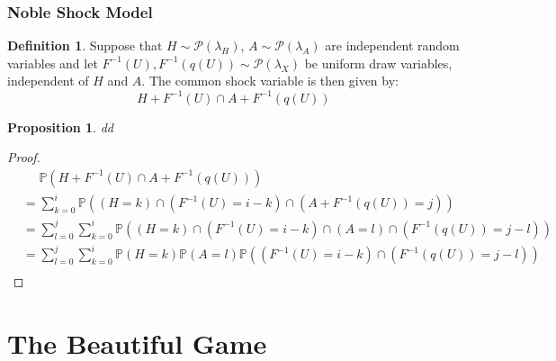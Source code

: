 \documentclass[a4paper,11pt,oneside]{book}
\theoremstyle{plain}
\newtheorem{prop}[thm]{Proposition}
\theoremstyle{definition}
\newtheorem{defn}{Definition}[section]
\begin{document}
\subsection{Noble Shock Model}
\begin{defn}
Suppose that $H \sim \mathcal{P}(\lambda_H)$, $A \sim \mathcal{P}(\lambda_A)$ are independent random variables and let $F^{-1}(U), F^{-1}(q(U)) \sim \mathcal{P}(\lambda_X)$ be uniform draw variables, independent of $H$ and $A$. The common shock variable is then given by: \[H+F^{-1}(U) \cap A+F^{-1}(q(U))\]
\end{defn}
\begin{prop}
dd
\end{prop}
\begin{proof}
\begin{align*}
&\phantom{=}\mathbb{P}(H+F^{-1}(U) \cap A+F^{-1}(q(U)))\\
&=\sum_{k=0}^i \mathbb{P}((H=k)\cap (F^{-1}(U)=i-k)\cap (A+F^{-1}(q(U))=j))\\
&=\sum_{l=0}^j\sum_{k=0}^i \mathbb{P}((H=k)\cap (F^{-1}(U)=i-k)\cap (A=l)\cap (F^{-1}(q(U))=j-l))\\
&=\sum_{l=0}^j\sum_{k=0}^i \mathbb{P}(H=k)\mathbb{P} (A=l)\mathbb{P}((F^{-1}(U)=i-k)\cap (F^{-1}(q(U))=j-l)) \\
\end{align*}

\end{proof}


























\chapter{The Beautiful Game}
\end{document}
